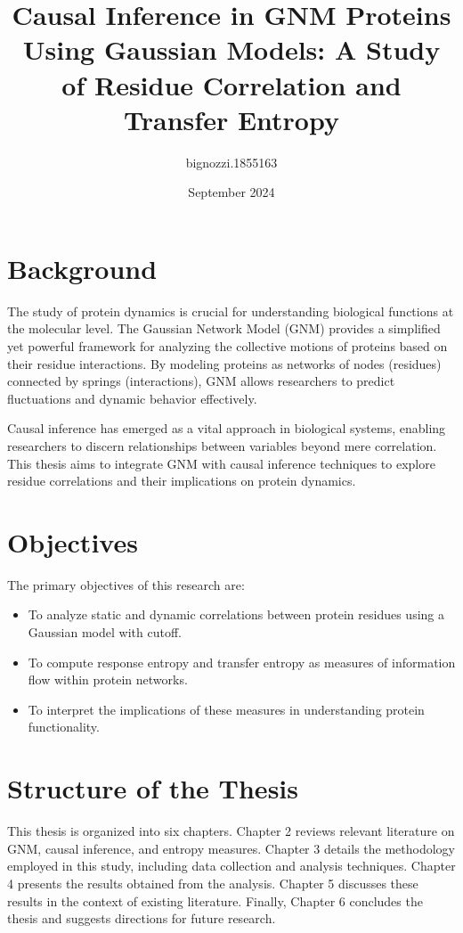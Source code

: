 \documentclass{report}  %
\title{Causal Inference in GNM Proteins Using Gaussian Models: A Study of Residue Correlation and Transfer Entropy}
\author{bignozzi.1855163 }
\date{September 2024}
\begin{document}
\maketitle


\section{Background}
The study of protein dynamics is crucial for understanding biological functions at the molecular level. The Gaussian Network Model (GNM) provides a simplified yet powerful framework for analyzing the collective motions of proteins based on their residue interactions. By modeling proteins as networks of nodes (residues) connected by springs (interactions), GNM allows researchers to predict fluctuations and dynamic behavior effectively.

Causal inference has emerged as a vital approach in biological systems, enabling researchers to discern relationships between variables beyond mere correlation. This thesis aims to integrate GNM with causal inference techniques to explore residue correlations and their implications on protein dynamics.

\section{Objectives}
The primary objectives of this research are:
\begin{itemize}
    \item To analyze static and dynamic correlations between protein residues using a Gaussian model with cutoff.
    \item To compute response entropy and transfer entropy as measures of information flow within protein networks.
    \item To interpret the implications of these measures in understanding protein functionality.
\end{itemize}

\section{Structure of the Thesis}
This thesis is organized into six chapters. Chapter 2 reviews relevant literature on GNM, causal inference, and entropy measures. Chapter 3 details the methodology employed in this study, including data collection and analysis techniques. Chapter 4 presents the results obtained from the analysis. Chapter 5 discusses these results in the context of existing literature. Finally, Chapter 6 concludes the thesis and suggests directions for future research.
\end{document}

